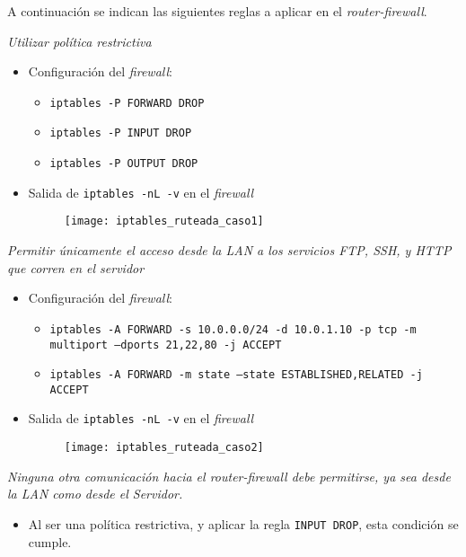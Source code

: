 A continuación se indican las siguientes reglas a aplicar en el \emph{router-firewall}.

\emph{Utilizar política restrictiva} 
~\\

\begin{itemize}
    \item Configuración del \emph{firewall}: 
    \begin{itemize}
        \item \texttt{iptables -P FORWARD DROP} 
        \item \texttt{iptables -P INPUT DROP} 
        \item \texttt{iptables -P OUTPUT DROP} 
    \end{itemize}
    \item Salida de \texttt{iptables -nL -v} en el \emph{firewall}  
    \begin{figure}[H]
        \centering
        \texttt{[image: iptables\_ruteada\_caso1]}
    \end{figure}
\end{itemize}

\emph{Permitir únicamente el acceso desde la LAN a los servicios FTP, SSH, y HTTP que corren en el servidor} 
~\\

\begin{itemize}
    \item Configuración del \emph{firewall}:
    \begin{itemize}
        \item \texttt{iptables -A FORWARD -s 10.0.0.0/24 -d 10.0.1.10 -p tcp -m multiport --dports 21,22,80 -j ACCEPT} 
        \item \texttt{iptables -A FORWARD -m state --state ESTABLISHED,RELATED -j ACCEPT} 
    \end{itemize}
    \item Salida de \texttt{iptables -nL -v} en el \emph{firewall}  
    \begin{figure}[H]
        \centering
        \texttt{[image: iptables\_ruteada\_caso2]}
    \end{figure}
\end{itemize}

\emph{Ninguna otra comunicación hacia el router-firewall debe permitirse, ya sea desde la LAN como desde el Servidor.} 
~\\

\begin{itemize}
    \item Al ser una política restrictiva, y aplicar la regla \texttt{INPUT DROP}, esta condición se cumple.
\end{itemize}

